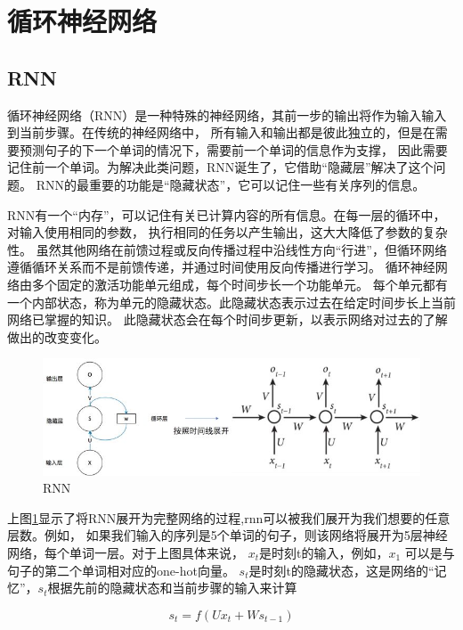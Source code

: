 \section{循环神经网络}

\subsection{RNN}

循环神经网络（RNN）是一种特殊的神经网络，其前一步的输出将作为输入输入到当前步骤。在传统的神经网络中，
所有输入和输出都是彼此独立的，但是在需要预测句子的下一个单词的情况下，需要前一个单词的信息作为支撑，
因此需要记住前一个单词。为解决此类问题，RNN诞生了，它借助“隐藏层”解决了这个问题。
RNN的最重要的功能是“隐藏状态”，它可以记住一些有关序列的信息。

RNN有一个“内存”，可以记住有关已计算内容的所有信息。在每一层的循环中，对输入使用相同的参数，
执行相同的任务以产生输出，这大大降低了参数的复杂性。
虽然其他网络在前馈过程或反向传播过程中沿线性方向“行进”，但循环网络遵循循环关系而不是前馈传递，并通过时间使用反向传播进行学习。
循环神经网络由多个固定的激活功能单元组成，每个时间步长一个功能单元。
每个单元都有一个内部状态，称为单元的隐藏状态。此隐藏状态表示过去在给定时间步长上当前网络已掌握的知识。
此隐藏状态会在每个时间步更新，以表示网络对过去的了解做出的改变变化。

\begin{figure}[htbp]
  \centering
  \includegraphics[scale=0.5]{./images/rnn.jpg}
  \caption{RNN}
  \label{fig:rnn}
\end{figure}

上图\ref{fig:rnn}显示了将RNN展开为完整网络的过程,rnn可以被我们展开为我们想要的任意层数。例如，
如果我们输入的序列是5个单词的句子，则该网络将展开为5层神经网络，每个单词一层。对于上图具体来说，
$x_{t}$是时刻t的输入，例如，$x_{1}$ 可以是与句子的第二个单词相对应的one-hot向量。
$s_{t}$是时刻t的隐藏状态，这是网络的“记忆”，$s_{t}$根据先前的隐藏状态和当前步骤的输入来计算

\begin{equation}
  s_{t}=f(U x_{t}+W s_{t-1})
  \end{equation}

